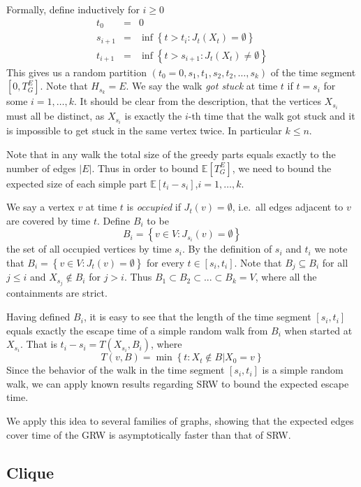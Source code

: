 \documentclass[12pt,a4paper]{article}
\newcommand{\set}[1]{{\left\{#1 \right\}}}
\newcommand{\0}{{\bf 0}}
\newcommand{\seq}{\subseteq}
\newcommand{\E}{{\mathbb E}}
\newcommand{\eqnar}[1]{\begin{eqnarray*}#1\end{eqnarray*}}
\begin{document}
    Formally, define inductively for $i \geq 0$
    \eqnar{
        t_0 & = & 0 \\
        s_{i+1} & = & \inf  \set{t > t_i : J_t(X_t)  = \emptyset} \\
        t_{i+1} & = & \inf \set{t > s_{i+1} : J_t(X_t)  \neq \emptyset}
    }
    This gives us a random partition $(t_0 = 0,s_1,t_1,s_2,t_2,\dots,s_k)$
    of the time segment $[0, T^E_G]$.
    Note that $H_{s_k} = E$.
    We say the walk \emph{got stuck} at time $t$ if $t = s_i$ for some $i = 1, \dots, k$.
    It should be clear from the description, that the vertices $X_{s_i}$ must all be distinct,
    as $X_{s_i}$ is exactly the $i$-th time that the walk got stuck and it is impossible to get stuck in the same vertex twice.
    In particular $k \leq n$.

    Note that in any walk the total size of the greedy parts equals exactly to the number of edges $|E|$.
    Thus in order to bound $\E[T^E_G]$, we need to bound the expected size of each simple part $\E[t_i - s_i]$,$i = 1, \dots, k$.

    We say a vertex $v$ at time $t$ is \emph{occupied} if $J_t(v) = \emptyset$,
    i.e.\ all edges adjacent to $v$ are covered by time $t$.
    Define $B_i$ to be
    \[
        B_i = \set{v \in V : J_{s_i}(v) = \emptyset}
    \]
    the set of all occupied vertices by time $s_i$.
    By the definition of $s_i$ and $t_i$ we note that
    $B_i = \set{v \in V : J_{t}(v) = \emptyset}$ for every $t \in [s_i, t_i]$.
    Note that $B_j \seq B_i$ for all $j \leq i$ and $X_{s_j} \notin B_i$ for $j > i$.
    Thus $B_1 \subset B_2 \subset ... \subset B_k = V$, where all the containments are strict.

    Having defined $B_i$, it is easy to see that the length of the time segment $[s_i, t_i]$
    equals exactly the escape time of a simple random walk from $B_i$ when started at $X_{s_i}$.
    That is $t_i - s_i = T(X_{s_i},B_i)$, where
    \[
        T(v,B) = \min\set{t: X_t \notin B | X_0 = v}
    \]
    Since the behavior of the walk in the time segment $[s_i, t_i]$ is a simple random walk,
    we can apply known results regarding SRW to bound the expected escape time.

    We apply this idea to several families of graphs,
    showing that the expected edges cover time of the GRW is asymptotically faster than that of SRW.

\subsection{Clique}\label{subsec:cluque}
\end{document}
